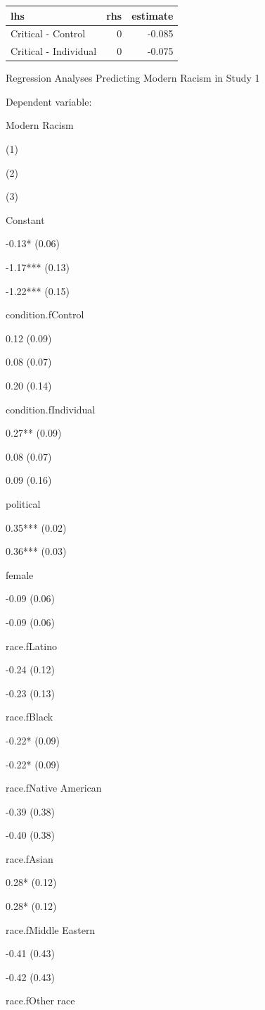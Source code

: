 \documentclass[
]{book}
\begin{document}
\begin{tabular}{l|r|r}
\hline
lhs & rhs & estimate\\
\hline
Critical - Control & 0 & -0.085\\
\hline
Critical - Individual & 0 & -0.075\\
\hline
\end{tabular}

Regression Analyses Predicting Modern Racism in Study 1

Dependent variable:

Modern Racism

(1)

(2)

(3)

Constant

-0.13* (0.06)

-1.17*** (0.13)

-1.22*** (0.15)

condition.fControl

0.12 (0.09)

0.08 (0.07)

0.20 (0.14)

condition.fIndividual

0.27** (0.09)

0.08 (0.07)

0.09 (0.16)

political

0.35*** (0.02)

0.36*** (0.03)

female

-0.09 (0.06)

-0.09 (0.06)

race.fLatino

-0.24 (0.12)

-0.23 (0.13)

race.fBlack

-0.22* (0.09)

-0.22* (0.09)

race.fNative American

-0.39 (0.38)

-0.40 (0.38)

race.fAsian

0.28* (0.12)

0.28* (0.12)

race.fMiddle Eastern

-0.41 (0.43)

-0.42 (0.43)

race.fOther race
\end{document}

